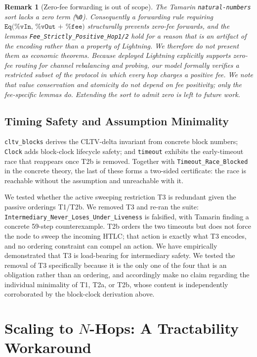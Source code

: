 \documentclass[sigconf,review]{acmart}
\theoremstyle{acmdefinition}
\newtheorem{remark}{Remark}
\begin{document}
\begin{remark}[Zero-fee forwarding is out of scope]
\label{rem:zerofee}
The Tamarin \texttt{natural-numbers} sort lacks a zero term (\texttt{\%0}). Consequently a forwarding rule requiring $\texttt{Eq(\%vIn, \%vOut + \%fee)}$ structurally prevents zero-fee forwards, and the lemmas \texttt{Fee\_Strictly\_}\texttt{Positive\_Hop1/2} hold for a reason that is an artifact of the encoding rather than a property of Lightning. We therefore do not present them as economic theorems. Because deployed Lightning explicitly supports zero-fee routing for channel rebalancing and probing, our model formally verifies a \emph{restricted subset} of the protocol in which every hop charges a positive fee. We note that value conservation and atomicity do not depend on fee positivity; only the fee-specific lemmas do. Extending the sort to admit zero is left to future work.
\end{remark}

\subsection{Timing Safety and Assumption Minimality}
\texttt{cltv\_blocks} derives the CLTV-delta invariant from concrete block numbers; \texttt{Clock} adds block-clock lifecycle safety; and \texttt{timeout} exhibits the early-timeout race that reappears once T2b is removed. Together with \texttt{Timeout\_Race\_Blocked} in the concrete theory, the last of these forms a two-sided certificate: the race is reachable without the assumption and unreachable with it.

We tested whether the active sweeping restriction T3 is redundant given the passive orderings T1/T2b. We removed T3 and re-ran the suite: \texttt{Intermediary\_Never\_Loses\_Under\_Liveness} is falsified, with Tamarin finding a concrete 59-step counterexample. T2b orders the two timeouts but does not force the node to sweep the incoming HTLC; that action is exactly what T3 encodes, and no ordering constraint can compel an action. We have empirically demonstrated that T3 is load-bearing for intermediary safety. We tested the removal of T3 specifically because it is the only one of the four that is an obligation rather than an ordering, and accordingly make no claim regarding the individual minimality of T1, T2a, or T2b, whose content is independently corroborated by the block-clock derivation above.

\section{Scaling to \texorpdfstring{$N$}{N}-Hops: A Tractability Workaround}
\label{sec:nhop}
\end{document}
